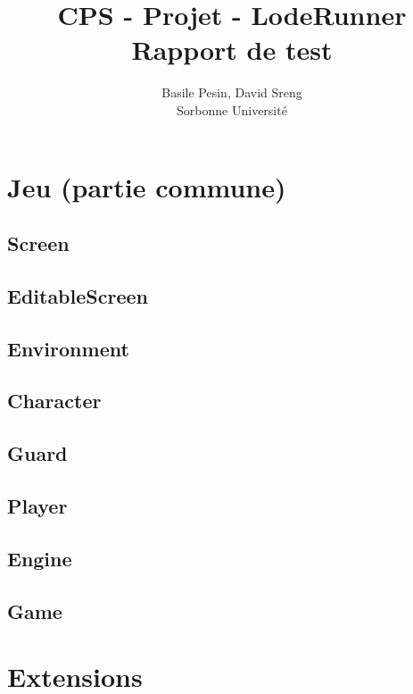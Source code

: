 \documentclass{article}
\title{CPS - Projet - LodeRunner\\Rapport de test}
\author{Basile Pesin, David Sreng\\Sorbonne Université}
\begin{document}
\maketitle

\section{Jeu (partie commune)}

\subsection{Screen}

\subsection{EditableScreen}

\subsection{Environment}

\subsection{Character}

\subsection{Guard}

\subsection{Player}

\subsection{Engine}

\subsection{Game}

\section{Extensions}
\end{document}
